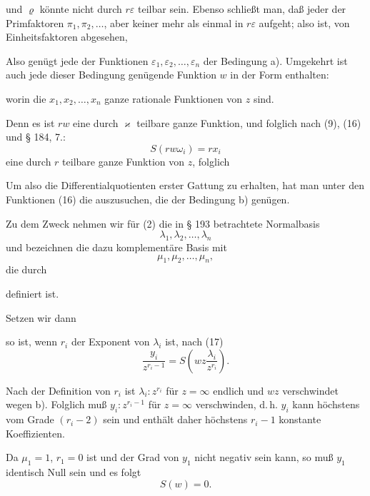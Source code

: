 und $\varrho$ könnte nicht durch $r\varepsilon$ teilbar sein. Ebenso schließt man,
daß jeder der Primfaktoren $\pi_1, \pi_2, \ldots$, aber keiner mehr als einmal
 in $r\varepsilon$ aufgeht; also ist, von Einheitsfaktoren abgesehen,


Also genügt jede der Funktionen $\varepsilon_1, \varepsilon_2, \ldots, \varepsilon_n$ der Bedingung a).
Umgekehrt ist auch jede dieser Bedingung genügende Funktion $w$
in der Form enthalten:


worin die $x_1, x_2, \ldots, x_n$ ganze rationale Funktionen von $z$ sind.

Denn es ist $rw$ eine durch $\varkappa$ teilbare ganze Funktion, und
folglich nach (9), (16) und § 184, 7.:
\[
S(rw\omega_i) = rx_i
\]
eine durch $r$ teilbare ganze Funktion von $z$, folglich


Um also die Differentialquotienten erster Gattung zu erhalten,
hat man unter den Funktionen (16) die auszusuchen, die
der Bedingung b) genügen.

Zu dem Zweck nehmen wir für (2) die in § 193 betrachtete
Normalbasis
\[
\lambda_1, \lambda_2, \ldots, \lambda_n
\]
und bezeichnen die dazu komplementäre Basis mit
\[
\mu_1, \mu_2, \ldots, \mu_n,
\]
die durch


definiert ist.

Setzen wir dann


so ist, wenn $r_i$ der Exponent von $\lambda_i$ ist, nach (17)
\[
\frac{y_i}{z^{r_i-1}} = S\!\left(wz\frac{\lambda_i}{z^{r_i}}\right)\!.
\]

Nach der Definition von $r_i$ ist $\lambda_i:z^{r_i}$ für $z=\infty$ endlich und
$wz$ verschwindet wegen b). Folglich muß $y_i:z^{r_i-1}$ für $z=\infty$
verschwinden, d.\,h. $y_i$ kann höchstens vom Grade $(r_i-2)$ sein
und enthält daher höchstens $r_i-1$ konstante Koeffizienten.

Da $\mu_1=1$, $r_1=0$ ist und der Grad von $y_1$ nicht negativ
sein kann, so muß $y_1$ identisch Null sein und es folgt
\[
S(w) = 0.
\]
